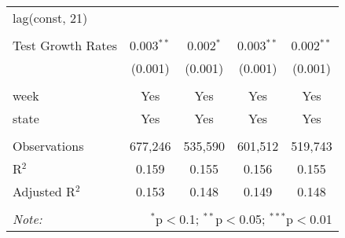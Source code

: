 \begin{tabular}{@{\extracolsep{1pt}}lcccc}
  lag(const, 21) &  &  &  &  \\ 
  &  &  &  &  \\ 
  Test Growth Rates & 0.003$^{**}$ & 0.002$^{*}$ & 0.003$^{**}$ & 0.002$^{**}$ \\ 
  & (0.001) & (0.001) & (0.001) & (0.001) \\ 
 \hline \\[-1.8ex] 
week & Yes & Yes & Yes & Yes \\ 
state & Yes & Yes & Yes & Yes \\ 
\hline \\[-1.8ex] 
Observations & 677,246 & 535,590 & 601,512 & 519,743 \\ 
R$^{2}$ & 0.159 & 0.155 & 0.156 & 0.155 \\ 
Adjusted R$^{2}$ & 0.153 & 0.148 & 0.149 & 0.148 \\ 
\hline 
\hline \\[-1.8ex] 
\textit{Note:}  & \multicolumn{4}{r}{$^{*}$p$<$0.1; $^{**}$p$<$0.05; $^{***}$p$<$0.01} \\ 
\end{tabular} 